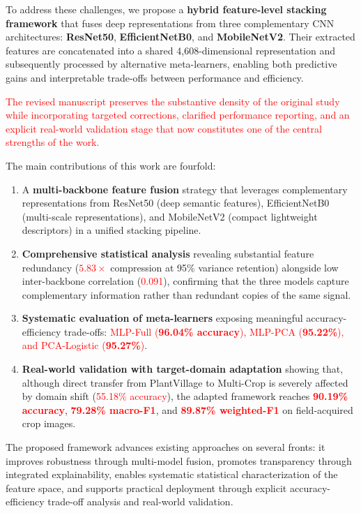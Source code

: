 \documentclass[pdflatex,sn-basic]{sn-jnl}
\begin{document}
To address these challenges, we propose a \textbf{hybrid feature-level stacking framework} that fuses deep representations from three complementary CNN architectures: \textbf{ResNet50}, \textbf{EfficientNetB0}, and \textbf{MobileNetV2}. Their extracted features are concatenated into a shared 4,608-dimensional representation and subsequently processed by alternative meta-learners, enabling both predictive gains and interpretable trade-offs between performance and efficiency.

\textcolor{red}{The revised manuscript preserves the substantive density of the original study while incorporating targeted corrections, clarified performance reporting, and an explicit real-world validation stage that now constitutes one of the central strengths of the work.}

The main contributions of this work are fourfold:
\begin{enumerate}
    \item A \textbf{multi-backbone feature fusion} strategy that leverages complementary representations from ResNet50 (deep semantic features), EfficientNetB0 (multi-scale representations), and MobileNetV2 (compact lightweight descriptors) in a unified stacking pipeline.

    \item \textbf{Comprehensive statistical analysis} revealing substantial feature redundancy (\textcolor{red}{$5.83\times$} compression at 95\% variance retention) alongside low inter-backbone correlation (\textcolor{red}{0.091}), confirming that the three models capture complementary information rather than redundant copies of the same signal.

    \item \textbf{Systematic evaluation of meta-learners} exposing meaningful accuracy-efficiency trade-offs: \textcolor{red}{MLP-Full (\textbf{96.04\% accuracy}), MLP-PCA (\textbf{95.22\%}), and PCA-Logistic (\textbf{95.27\%})}.

    \item \textbf{Real-world validation with target-domain adaptation} showing that, although direct transfer from PlantVillage to Multi-Crop is severely affected by domain shift (\textcolor{red}{55.18\% accuracy}), the adapted framework reaches \textcolor{red}{\textbf{90.19\% accuracy}}, \textcolor{red}{\textbf{79.28\% macro-F1}}, and \textcolor{red}{\textbf{89.87\% weighted-F1}} on field-acquired crop images.
\end{enumerate}

The proposed framework advances existing approaches on several fronts: it improves robustness through multi-model fusion, promotes transparency through integrated explainability, enables systematic statistical characterization of the feature space, and supports practical deployment through explicit accuracy-efficiency trade-off analysis and real-world validation.
\end{document}
